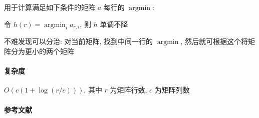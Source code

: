 用于计算满足如下条件的矩阵 \(a\) 每行的 \(\operatorname{argmin}\):

\begin{center}
    令 \(h(r) = \operatorname{argmin}_i a_{r,i}\), 则 \(h\) 单调不降
\end{center}

不难发现可以分治: 对当前矩阵, 找到中间一行的 \(\operatorname{argmin}\), 然后就可根据这个将矩阵分为更小的两个矩阵

\paragraph{复杂度} \(O(c(1+\log(r/c)))\), 其中 \(r\) 为矩阵行数, \(c\) 为矩阵列数

\paragraph{参考文献}

\cite{enwiki:1033199110}
